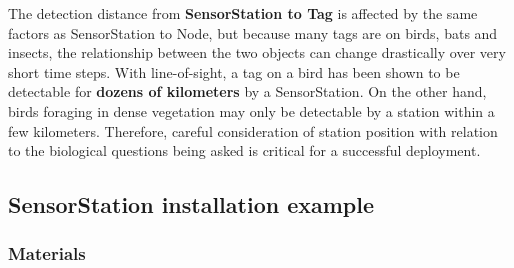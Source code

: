 \documentclass[
]{article}
\begin{document}
The detection distance from \textbf{SensorStation to Tag} is affected by
the same factors as SensorStation to Node, but because many tags are on
birds, bats and insects, the relationship between the two objects can
change drastically over very short time steps. With line-of-sight, a tag
on a bird has been shown to be detectable for \textbf{dozens of
kilometers} by a SensorStation. On the other hand, birds foraging in
dense vegetation may only be detectable by a station within a few
kilometers. Therefore, careful consideration of station position with
relation to the biological questions being asked is critical for a
successful deployment.

\hypertarget{sensorstation-installation-example}{%
\subsection{SensorStation installation
example}\label{sensorstation-installation-example}}

\hypertarget{materials}{%
\subsubsection{Materials}\label{materials}}
\end{document}
